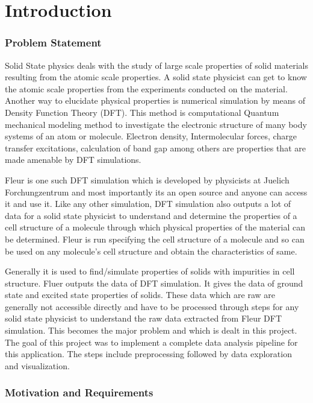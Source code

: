 
\chapter{Introduction}
\label{chap:intro}

\subsection{Problem Statement}
Solid State physics deals with the study of large scale properties of solid materials resulting from the atomic scale properties. A solid state physicist can get to know the atomic scale properties from the experiments conducted on the material. Another way to elucidate physical properties is numerical simulation by means of Density Function Theory (DFT). This method is computational Quantum mechanical modeling method to investigate the electronic structure of many body systems of an atom or molecule. Electron density, Intermolecular forces, charge transfer excitations, calculation of band gap among others are properties that are made amenable by DFT  simulations. 

Fleur is one such DFT simulation which is developed by physicists at Juelich Forchungzentrum and most importantly its an open source and anyone can access it and use it. Like any other simulation, DFT simulation also outputs a lot of data for a solid state physicist to understand and determine the properties of a cell structure of a molecule through which physical properties of the material can be determined. Fleur is run specifying the cell structure of a molecule and so can be used on any molecule's cell structure and obtain the characteristics of same.

Generally it is used to find/simulate properties of solids with impurities in cell structure. Fluer outputs the data of DFT simulation. It gives the data of ground state and excited state properties of solids. These data which are raw are generally not accessible directly and have to be processed through steps for any solid state physicist to understand the raw data extracted from Fleur DFT simulation. This becomes the major problem and which is dealt in this project. The goal of this project was to implement a complete data analysis pipeline for this application. The steps include preprocessing followed by data exploration and visualization.

\subsection{Motivation and Requirements}

